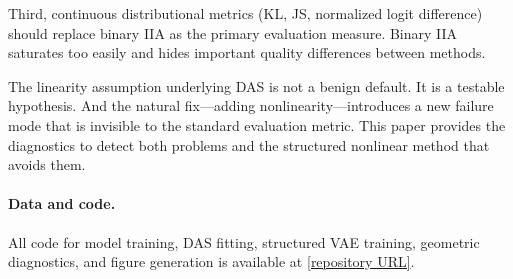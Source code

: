 \documentclass{article}
\begin{document}
Third, continuous distributional metrics (KL, JS, normalized logit difference)
should replace binary IIA as the primary evaluation measure. Binary IIA
saturates too easily and hides important quality differences between methods.

The linearity assumption underlying DAS is not a benign default. It is a testable
hypothesis. And the natural fix---adding nonlinearity---introduces a new failure
mode that is invisible to the standard evaluation metric. This paper provides
the diagnostics to detect both problems and the structured nonlinear method
that avoids them.

\paragraph{Data and code.} All code for model training, DAS fitting, structured
VAE training, geometric diagnostics, and figure generation is available at
\url{[repository URL]}.



\end{document}
